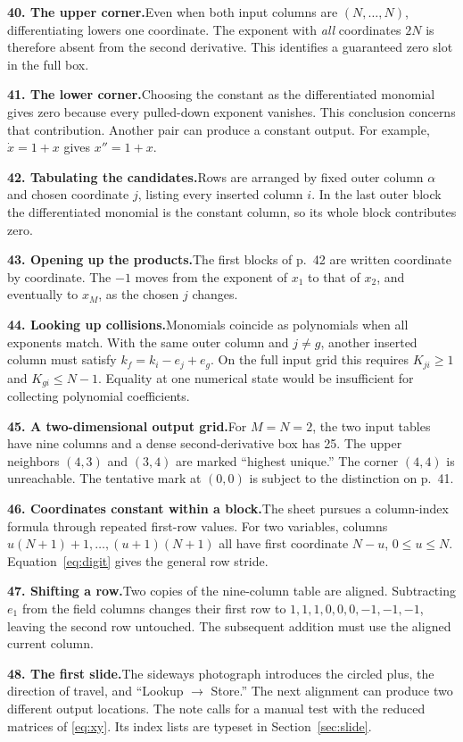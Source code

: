 \documentclass[11pt,letterpaper]{article}
\newcommand{\leaf}[2]{\par\smallskip\begingroup\interlinepenalty=10000\noindent\textbf{#1}\enspace #2\par\endgroup}
\begin{document}
\leaf{40. The upper corner.}{Even when both input columns are
\((N,\ldots,N)\), differentiating lowers one coordinate. The exponent with
\emph{all} coordinates \(2N\) is therefore absent from the second derivative.
This identifies a guaranteed zero slot in the full box.}
\leaf{41. The lower corner.}{Choosing the constant as the differentiated
monomial gives zero because every pulled-down exponent vanishes.
This conclusion concerns that contribution. Another pair can produce a
constant output. For example, \(\dot x=1+x\) gives \(x''=1+x\).}
\leaf{42. Tabulating the candidates.}{Rows are arranged by fixed outer
column \(\alpha\) and chosen coordinate \(j\), listing every inserted column
\(i\). In the last outer block the differentiated monomial is the constant
column, so its whole block contributes zero.}
\leaf{43. Opening up the products.}{The first blocks of p.~42 are written
coordinate by coordinate. The \(-1\) moves from the exponent of \(x_1\)
to that of \(x_2\), and eventually to \(x_M\), as the chosen \(j\) changes.}
\leaf{44. Looking up collisions.}{Monomials coincide as polynomials when
all exponents match. With the same outer column and \(j\ne g\), another
inserted column must satisfy \(k_f=k_i-e_j+e_g\).
On the full input grid this requires \(K_{ji}\ge1\) and
\(K_{gi}\le N-1\). Equality at one numerical state would be insufficient
for collecting polynomial coefficients.}
\leaf{45. A two-dimensional output grid.}{For \(M=N=2\), the two input
tables have nine columns and a dense second-derivative box has 25. The
upper neighbors \((4,3)\) and \((3,4)\) are marked “highest unique.”
The corner \((4,4)\) is unreachable. The tentative mark at \((0,0)\)
is subject to the distinction on p.~41.}
\leaf{46. Coordinates constant within a block.}{The sheet pursues a
column-index formula through repeated first-row values. For two variables,
columns \(u(N+1)+1,\ldots,(u+1)(N+1)\) all have first coordinate \(N-u\),
\(0\le u\le N\). Equation~\eqref{eq:digit} gives the general row stride.}
\leaf{47. Shifting a row.}{Two copies of the nine-column table are aligned.
Subtracting \(e_1\) from the field columns changes their first row to
\(1,1,1,0,0,0,-1,-1,-1\), leaving the second row untouched.
The subsequent addition must use the aligned current column.}
\leaf{48. The first slide.}{The sideways photograph introduces the circled
plus, the direction of travel, and “Lookup \(\to\) Store.” The next alignment
can produce two different output locations. The note calls for a manual
test with the reduced matrices of \eqref{eq:xy}. Its index lists are
typeset in Section~\ref{sec:slide}.}
\end{document}
